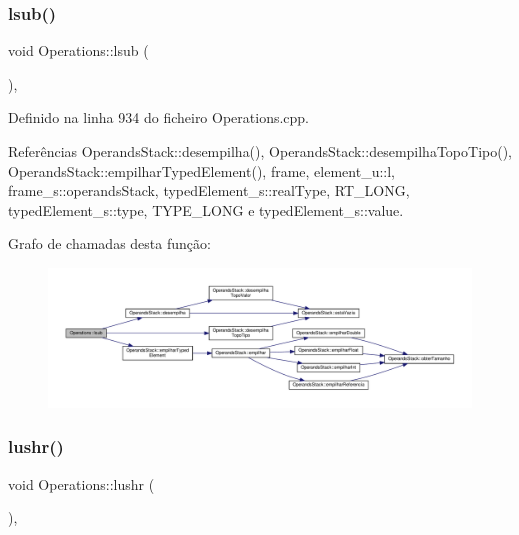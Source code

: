 \subsubsection{\texorpdfstring{lsub()}{lsub()}}
{\footnotesize\ttfamily void Operations\+::lsub (\begin{DoxyParamCaption}{ }\end{DoxyParamCaption})\hspace{0.3cm}{\ttfamily [static]}, {\ttfamily [private]}}



Definido na linha 934 do ficheiro Operations.\+cpp.



Referências Operands\+Stack\+::desempilha(), Operands\+Stack\+::desempilha\+Topo\+Tipo(), Operands\+Stack\+::empilhar\+Typed\+Element(), frame, element\+\_\+u\+::l, frame\+\_\+s\+::operands\+Stack, typed\+Element\+\_\+s\+::real\+Type, R\+T\+\_\+\+L\+O\+NG, typed\+Element\+\_\+s\+::type, T\+Y\+P\+E\+\_\+\+L\+O\+NG e typed\+Element\+\_\+s\+::value.

Grafo de chamadas desta função\+:\nopagebreak
\begin{figure}[H]
\begin{center}
\leavevmode
\includegraphics[width=350pt]{classOperations_a32485b21761b1e5540a6575822a2661a_cgraph}
\end{center}
\end{figure}
\mbox{\label{classOperations_a3b7c61f8bca7b3ad0dacae6649aee042}} 
\subsubsection{\texorpdfstring{lushr()}{lushr()}}
{\footnotesize\ttfamily void Operations\+::lushr (\begin{DoxyParamCaption}{ }\end{DoxyParamCaption})\hspace{0.3cm}{\ttfamily [static]}, {\ttfamily [private]}}



